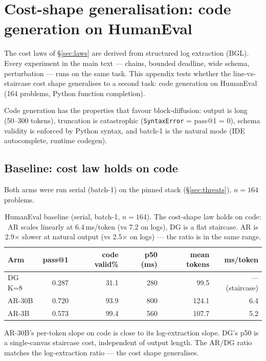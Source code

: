 \section{Cost-shape generalisation: code generation on HumanEval}
\label{app:humaneval}

The cost laws of \S\ref{sec:laws} are derived from structured log
extraction (BGL). Every experiment in the main text --- chains,
bounded deadline, wide schema, perturbation --- runs on the same task.
This appendix tests whether the line-vs-staircase cost shape
generalises to a second task: code generation on
HumanEval~\cite{humaneval} (164 problems, Python function completion).

Code generation has the properties that favour block-diffusion: output
is long (50--300 tokens), truncation is catastrophic
(\texttt{SyntaxError} = pass@1 = 0), schema validity is enforced by
Python syntax, and batch-1 is the natural mode (IDE autocomplete,
runtime codegen).

\subsection{Baseline: cost law holds on code}

Both arms were run serial (batch-1) on the pinned stack
(\S\ref{sec:threats}), $n{=}164$ problems.

\begin{table}[h]
\centering
\caption{HumanEval baseline (serial, batch-1, $n{=}164$). The cost-shape
law holds on code: AR scales linearly at 6.4\,ms/token (vs 7.2 on logs),
DG is a flat staircase. AR is 2.9$\times$ slower at natural output
(vs 2.5$\times$ on logs) --- the ratio is in the same range.}
\label{tab:humaneval}
\begin{tabular}{@{}lrrrrr@{}}
\toprule
Arm & pass@1 & code valid\% & p50 (ms) & mean tokens & ms/token \\
\midrule
DG K=8  & 0.287 & 31.1 & 280 & 99.5  & --- (staircase) \\
AR-30B  & 0.720 & 93.9 & 800 & 124.1 & 6.4 \\
AR-3B   & 0.573 & 99.4 & 560 & 107.7 & 5.2 \\
\bottomrule
\end{tabular}
\end{table}

AR-30B's per-token slope on code is close to its log-extraction slope.
DG's p50 is a single-canvas staircase cost, independent of output
length. The AR/DG ratio matches the log-extraction ratio --- the cost
shape generalises.

